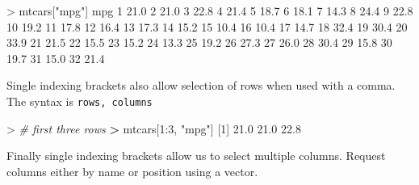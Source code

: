 \documentclass[
]{book}
\newenvironment{Shaded}{\begin{snugshade}}{\end{snugshade}}
\newcommand{\CommentTok}[1]{\textcolor[rgb]{0.56,0.35,0.01}{\textit{#1}}}
\newcommand{\DecValTok}[1]{\textcolor[rgb]{0.00,0.00,0.81}{#1}}
\newcommand{\ErrorTok}[1]{\textcolor[rgb]{0.64,0.00,0.00}{\textbf{#1}}}
\newcommand{\FloatTok}[1]{\textcolor[rgb]{0.00,0.00,0.81}{#1}}
\newcommand{\NormalTok}[1]{#1}
\newcommand{\SpecialCharTok}[1]{\textcolor[rgb]{0.00,0.00,0.00}{#1}}
\newcommand{\StringTok}[1]{\textcolor[rgb]{0.31,0.60,0.02}{#1}}
\begin{document}
\begin{Shaded}
\begin{Highlighting}[]
\SpecialCharTok{\textgreater{}}\NormalTok{ mtcars[}\StringTok{"mpg"}\NormalTok{]}
\NormalTok{    mpg}
\DecValTok{1}  \FloatTok{21.0}
\DecValTok{2}  \FloatTok{21.0}
\DecValTok{3}  \FloatTok{22.8}
\DecValTok{4}  \FloatTok{21.4}
\DecValTok{5}  \FloatTok{18.7}
\DecValTok{6}  \FloatTok{18.1}
\DecValTok{7}  \FloatTok{14.3}
\DecValTok{8}  \FloatTok{24.4}
\DecValTok{9}  \FloatTok{22.8}
\DecValTok{10} \FloatTok{19.2}
\DecValTok{11} \FloatTok{17.8}
\DecValTok{12} \FloatTok{16.4}
\DecValTok{13} \FloatTok{17.3}
\DecValTok{14} \FloatTok{15.2}
\DecValTok{15} \FloatTok{10.4}
\DecValTok{16} \FloatTok{10.4}
\DecValTok{17} \FloatTok{14.7}
\DecValTok{18} \FloatTok{32.4}
\DecValTok{19} \FloatTok{30.4}
\DecValTok{20} \FloatTok{33.9}
\DecValTok{21} \FloatTok{21.5}
\DecValTok{22} \FloatTok{15.5}
\DecValTok{23} \FloatTok{15.2}
\DecValTok{24} \FloatTok{13.3}
\DecValTok{25} \FloatTok{19.2}
\DecValTok{26} \FloatTok{27.3}
\DecValTok{27} \FloatTok{26.0}
\DecValTok{28} \FloatTok{30.4}
\DecValTok{29} \FloatTok{15.8}
\DecValTok{30} \FloatTok{19.7}
\DecValTok{31} \FloatTok{15.0}
\DecValTok{32} \FloatTok{21.4}
\end{Highlighting}
\end{Shaded}

Single indexing brackets also allow selection of rows when used with a comma. The syntax is \texttt{rows,\ columns}

\begin{Shaded}
\begin{Highlighting}[]
\SpecialCharTok{\textgreater{}} \CommentTok{\# first three rows}
\ErrorTok{\textgreater{}}\NormalTok{ mtcars[}\DecValTok{1}\SpecialCharTok{:}\DecValTok{3}\NormalTok{, }\StringTok{"mpg"}\NormalTok{]}
\NormalTok{[}\DecValTok{1}\NormalTok{] }\FloatTok{21.0} \FloatTok{21.0} \FloatTok{22.8}
\end{Highlighting}
\end{Shaded}

Finally single indexing brackets allow us to select multiple columns. Request columns either by name or position using a vector.
\end{document}
